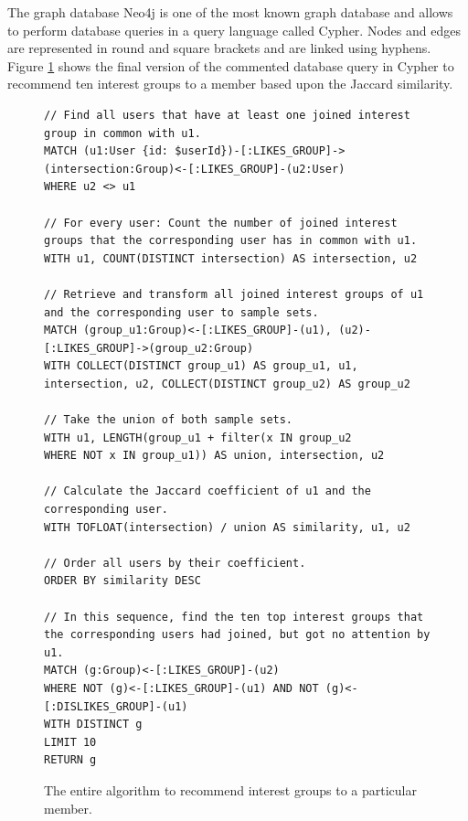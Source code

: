 \documentclass[12pt,numbers=noenddot,parskip,bibliography=totocnumbered,listof=totocnumbered,draft]{scrreprt}
\begin{document}
The graph database \mbox{Neo4j} \citep{neo4j} is one of the most known graph database and allows to perform database queries in a query language called \mbox{Cypher}. Nodes and edges are represented in round and square brackets and are linked using hyphens. Figure \ref{recommendationalogrithminterestgroups} shows the final version of the commented database query in \mbox{Cypher} to recommend ten interest groups to a member based upon the Jaccard similarity.

\begin{figure}
\centering
\begin{lstlisting}
// Find all users that have at least one joined interest group in common with u1.
MATCH (u1:User {id: $userId})-[:LIKES_GROUP]->(intersection:Group)<-[:LIKES_GROUP]-(u2:User)
WHERE u2 <> u1

// For every user: Count the number of joined interest groups that the corresponding user has in common with u1.
WITH u1, COUNT(DISTINCT intersection) AS intersection, u2

// Retrieve and transform all joined interest groups of u1 and the corresponding user to sample sets.
MATCH (group_u1:Group)<-[:LIKES_GROUP]-(u1), (u2)-[:LIKES_GROUP]->(group_u2:Group)
WITH COLLECT(DISTINCT group_u1) AS group_u1, u1, intersection, u2, COLLECT(DISTINCT group_u2) AS group_u2

// Take the union of both sample sets.
WITH u1, LENGTH(group_u1 + filter(x IN group_u2
WHERE NOT x IN group_u1)) AS union, intersection, u2

// Calculate the Jaccard coefficient of u1 and the corresponding user.
WITH TOFLOAT(intersection) / union AS similarity, u1, u2

// Order all users by their coefficient.
ORDER BY similarity DESC

// In this sequence, find the ten top interest groups that the corresponding users had joined, but got no attention by u1.
MATCH (g:Group)<-[:LIKES_GROUP]-(u2)
WHERE NOT (g)<-[:LIKES_GROUP]-(u1) AND NOT (g)<-[:DISLIKES_GROUP]-(u1)
WITH DISTINCT g
LIMIT 10
RETURN g
\end{lstlisting}
\caption[Algorithm to recommend interest groups]{The entire algorithm to recommend interest groups to a particular member.}
\label{recommendationalogrithminterestgroups}
\end{figure}
\end{document}
